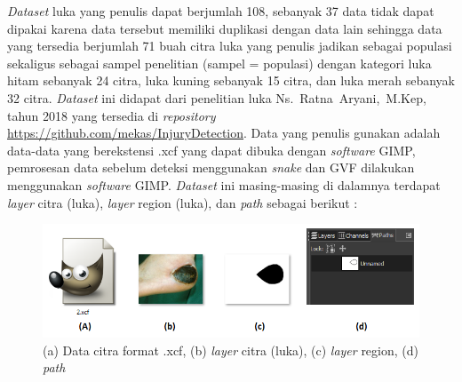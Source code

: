 \emph{Dataset} luka yang penulis dapat berjumlah 108, sebanyak 37 data tidak dapat dipakai karena data tersebut memiliki duplikasi dengan data lain sehingga data yang tersedia berjumlah 71 buah citra luka yang penulis jadikan sebagai populasi sekaligus sebagai sampel penelitian (sampel = populasi) dengan kategori luka hitam sebanyak 24 citra, luka kuning sebanyak 15 citra, dan luka merah sebanyak 32 citra. \emph{Dataset} ini didapat dari penelitian luka \mbox{Ns. Ratna Aryani, M.Kep}, tahun 2018 \mbox{\citep{ratna2018rancang}} yang tersedia di \emph{repository} \url{https://github.com/mekas/InjuryDetection}. Data yang penulis gunakan adalah data-data yang berekstensi .xcf yang dapat dibuka dengan \emph{software} GIMP, pemrosesan data sebelum deteksi menggunakan \emph{snake} dan GVF dilakukan menggunakan \emph{software} GIMP. \emph{Dataset} ini masing-masing di dalamnya terdapat \emph{layer} citra (luka), \emph{layer} region (luka), dan \emph{path} sebagai berikut :
\begin{figure}[H]
	\centering
	\includegraphics[width=1\textwidth]{gambar/isi_file_xcf}
	\caption{(a) Data citra format .xcf, (b) \emph{layer} citra (luka), (c) \emph{layer} region, (d) \emph{path} }
	\label{Gambar:isi_file_xcf}
\end{figure}

